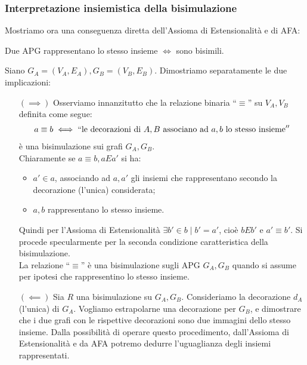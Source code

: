 \subsubsection{Interpretazione insiemistica della bisimulazione}
Mostriamo ora una conseguenza diretta dell'Assioma di Estensionalità e di AFA:
\begin{theorem}
    Due APG rappresentano lo stesso insieme $\iff$ sono bisimili.
    \label{theo:bisi_iff_eqsets}
\end{theorem}
\begin{proof2}
    Siano $G_A = (V_A, E_A), G_B = (V_B, E_B)$. Dimostriamo separatamente le due implicazioni:
    \begin{enumerate}
        \item[$(\implies)$] Osserviamo innanzitutto che la relazione binaria ``$\equiv$'' su $V_A, V_B$ definita come segue:
              \begin{gather*}
                  a \equiv b \iff ``\text{le decorazioni di } A,B \text{ associano ad } a,b \text{ lo stesso insieme}''
              \end{gather*}
              è una bisimulazione sui grafi $G_A, G_B$.\\
              Chiaramente se $a \equiv b, a E a'$ si ha:
              \begin{itemize}
                  \item $a' \in a$, associando ad $a,a'$ gli insiemi che rappresentano secondo la decorazione (l'unica) considerata;
                  \item $a,b$ rappresentano lo stesso insieme.
              \end{itemize}
              Quindi per l'Assioma di Estensionalità $\exists b' \in b\mid b' = a'$, cioè $b E b'$ e $a' \equiv b'$. Si procede specularmente per la seconda condizione caratteristica della bisimulazione.\\
              La relazione ``$\equiv$'' è una bisimulazione sugli APG $G_A,G_B$ quando si assume per ipotesi che rappresentino lo stesso insieme.
        \item[$(\impliedby)$] Sia $R$ una bisimulazione su $G_A,G_B$. Consideriamo la decorazione $d_A$ (l'unica) di $G_A$. Vogliamo estrapolarne una decorazione per $G_B$, e dimostrare che i due grafi con le rispettive decorazioni sono due immagini dello stesso insieme. Dalla possibilità di operare questo procedimento, dall'Assioma di Estensionalità e da AFA potremo dedurre l'uguaglianza degli insiemi rappresentati.\\

\end{enumerate}
\end{proof2}
